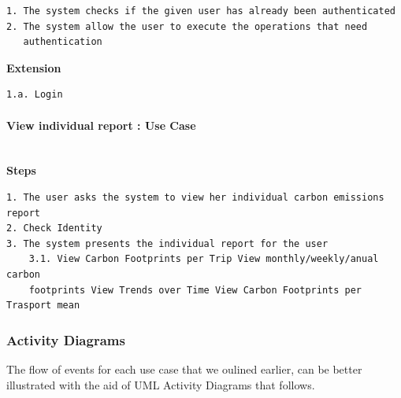 \begin{verbatim}
1. The system checks if the given user has already been authenticated
2. The system allow the user to execute the operations that need
   authentication
\end{verbatim}

\textcolor[rgb]{0.00,0.00,1.00}{\textbf{Extension}}
\begin{verbatim}
1.a. Login
\end{verbatim}


\paragraph{View individual report : Use Case}

\mbox{}\\
\newline
\textcolor[rgb]{0.00,0.00,1.00}{\textbf{Steps}}

\begin{verbatim}
1. The user asks the system to view her individual carbon emissions report
2. Check Identity
3. The system presents the individual report for the user
    3.1. View Carbon Footprints per Trip View monthly/weekly/anual carbon
    footprints View Trends over Time View Carbon Footprints per Trasport mean
\end{verbatim}


\subsubsection{Activity Diagrams}

The flow of events for each use case that we oulined earlier, can be better illustrated with the aid of UML Activity Diagrams that follows.

